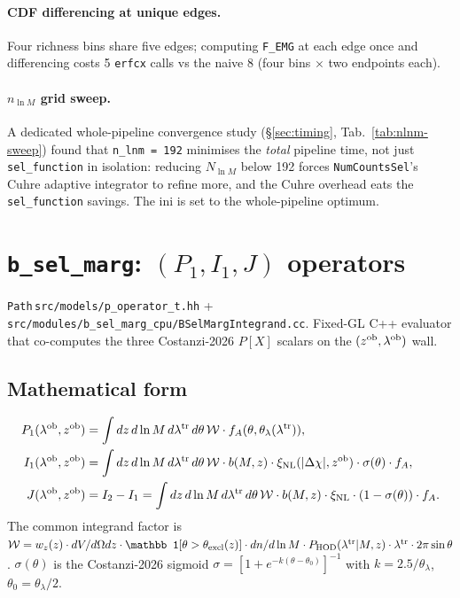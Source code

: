 \documentclass[a4paper, 11pt]{article}
\newcommand{\lob}{\lambda^{\rm ob}}
\newcommand{\ltr}{\lambda^{\rm tr}}
\newcommand{\zob}{z^{\rm ob}}
\newcommand{\xinl}{\xi_{\rm NL}}
\newcommand{\modname}[1]{\textcolor{kwcol}{\texttt{#1}}}
\newcommand{\pyfile}[1]{{\small\texttt{#1}}}
\begin{document}
\paragraph{CDF differencing at unique edges.}  Four richness bins
share five edges; computing \texttt{F\_EMG} at each edge once and
differencing costs 5 \texttt{erfcx} calls vs the naive 8 (four bins
$\times$ two endpoints each).

\paragraph{$n_{\ln M}$ grid sweep.}  A dedicated whole-pipeline
convergence study (\S\ref{sec:timing}, Tab.~\ref{tab:nlnm-sweep})
found that \texttt{n\_lnm = 192} minimises the \emph{total} pipeline
time, not just \modname{sel\_function} in isolation: reducing
$N_{\ln M}$ below 192 forces \modname{NumCountsSel}'s Cuhre adaptive
integrator to refine more, and the Cuhre overhead eats the
\modname{sel\_function} savings.  The ini is set to the whole-pipeline
optimum.

\section{\texttt{b\_sel\_marg}: $(P_1, I_1, J)$ operators}
\label{sec:b_sel_marg}

\modname{Path}\,\pyfile{src/models/p\_operator\_t.hh} +
\pyfile{src/modules/b\_sel\_marg\_cpu/BSelMargIntegrand.cc}. Fixed-GL
C++ evaluator that co-computes the three Costanzi-2026 $P[X]$
scalars on the $(\zob, \lob)$ wall.

\subsection{Mathematical form}

\begin{align}
  P_1(\lob, \zob) &= \int dz\, d\ln M\, d\ltr\, d\theta\,
                     \mathcal W \cdot f_A(\theta, \theta_\lambda(\ltr)), \\
  I_1(\lob, \zob) &= \int dz\, d\ln M\, d\ltr\, d\theta\,
                     \mathcal W \cdot b(M,z) \cdot \xinl(|\Delta \chi|, \zob)
                     \cdot \sigma(\theta) \cdot f_A, \\
  J(\lob, \zob)   &= I_2 - I_1 =
                     \int dz\, d\ln M\, d\ltr\, d\theta\,
                     \mathcal W \cdot b(M,z) \cdot \xinl \cdot (1-\sigma(\theta))
                     \cdot f_A.
\end{align}
The common integrand factor is
$\mathcal W = w_z(z) \cdot dV/d\Omega dz \cdot \mathbb 1[\theta > \theta_{\rm excl}(z)]
             \cdot dn/d\ln M \cdot P_{\rm HOD}(\ltr | M, z) \cdot \ltr
             \cdot 2\pi \sin\theta$.
$\sigma(\theta)$ is the Costanzi-2026 sigmoid
$\sigma = [1 + e^{-k(\theta - \theta_0)}]^{-1}$
with $k = 2.5/\theta_\lambda$, $\theta_0 = \theta_\lambda / 2$.
\end{document}
